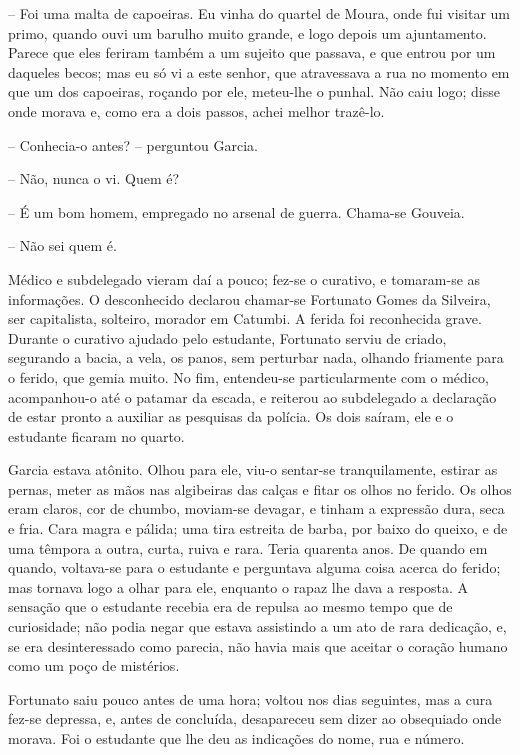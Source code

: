 -- Foi uma malta de capoeiras. Eu vinha do quartel de Moura, onde fui
visitar um primo, quando ouvi um barulho muito grande, e logo depois um
ajuntamento. Parece que eles feriram também a um sujeito que passava, e
que entrou por um daqueles becos; mas eu só vi a este senhor, que
atravessava a rua no momento em que um dos capoeiras, roçando por ele,
meteu-lhe o punhal. Não caiu logo; disse onde morava e, como era a dois
passos, achei melhor trazê-lo.

-- Conhecia-o antes? -- perguntou Garcia.

-- Não, nunca o vi. Quem é?

-- É um bom homem, empregado no arsenal de guerra. Chama-se Gouveia.

-- Não sei quem é.

Médico e subdelegado vieram daí a pouco; fez-se o curativo, e tomaram-se
as informações. O desconhecido declarou chamar-se Fortunato Gomes da
Silveira, ser capitalista, solteiro, morador em Catumbi. A ferida foi
reconhecida grave. Durante o curativo ajudado pelo estudante, Fortunato
serviu de criado, segurando a bacia, a vela, os panos, sem perturbar
nada, olhando friamente para o ferido, que gemia muito. No fim,
entendeu-se particularmente com o médico, acompanhou-o até o patamar da
escada, e reiterou ao subdelegado a declaração de estar pronto a
auxiliar as pesquisas da polícia. Os dois saíram, ele e o estudante
ficaram no quarto.

Garcia estava atônito. Olhou para ele, viu-o sentar-se tranquilamente,
estirar as pernas, meter as mãos nas algibeiras das calças e fitar os
olhos no ferido. Os olhos eram claros, cor de chumbo, moviam-se devagar,
e tinham a expressão dura, seca e fria. Cara magra e pálida; uma tira
estreita de barba, por baixo do queixo, e de uma têmpora a outra, curta,
ruiva e rara. Teria quarenta anos. De quando em quando, voltava-se para
o estudante e perguntava alguma coisa acerca do ferido; mas tornava logo
a olhar para ele, enquanto o rapaz lhe dava a resposta. A sensação que o
estudante recebia era de repulsa ao mesmo tempo que de curiosidade; não
podia negar que estava assistindo a um ato de rara dedicação, e, se era
desinteressado como parecia, não havia mais que aceitar o coração humano
como um poço de mistérios.

Fortunato saiu pouco antes de uma hora; voltou nos dias seguintes, mas a
cura fez-se depressa, e, antes de concluída, desapareceu sem dizer ao
obsequiado onde morava. Foi o estudante que lhe deu as indicações do
nome, rua e número.

